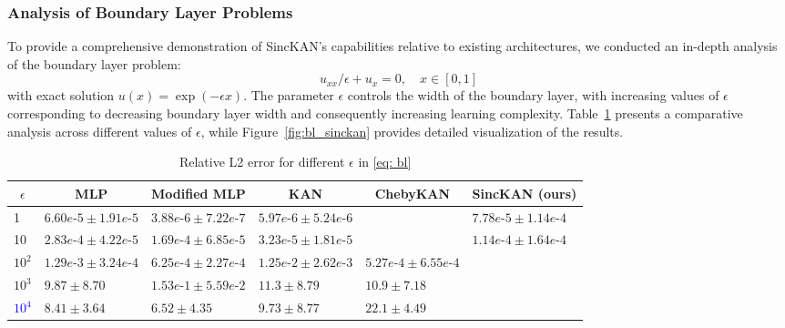 \subsubsection{Analysis of Boundary Layer Problems}
To provide a comprehensive demonstration of SincKAN's capabilities relative to existing architectures, we conducted an in-depth analysis of the boundary layer problem:
\begin{equation} \label
{eq: bl}
u_{xx}/\epsilon+u_{x}=0, \quad x \in
 [0,1]
\end{equation}
with exact solution $u(x)=\exp (-\epsilon x)$. The parameter $\epsilon$ controls the width of the boundary layer, with increasing values of $\epsilon$ corresponding to decreasing boundary layer width and consequently increasing learning complexity. Table~\ref{table:bl_pikan} presents a comparative analysis across different values of $\epsilon$, while Figure~\ref{fig:bl_sinckan}
 provides detailed visualization of the results.

\begin{table}[ht]
\caption{Relative L2 error for different $\epsilon$ in \cref{eq: bl}}
\label{table:bl_pikan}
\begin{center}
\begin{adjustbox}{width=\columnwidth, center}
\begin{tabular}{llllll}
\multicolumn{1}{c}{\bf $\epsilon$ } & \multicolumn{1}{c}{\bf MLP} & \multicolumn{1}{c}{\bf Modified MLP} &\multicolumn{1}{c}{\bf KAN} &\multicolumn{1}{c}{\bf ChebyKAN} & \multicolumn{1}{c}{\bf SincKAN (ours)} 
\\ \hline 
1    & $ 6.60e\mbox{-}5 \pm 1.91e\mbox{-}5 $ &$ 3.88e\mbox{-}6 \pm 7.22e\mbox{-}7 $   & $ 5.97e\mbox{-}6 \pm 5.24e\mbox{-}6 $ & \color{red}{$ 1.98e\mbox{-}6 \pm 4.51e\mbox{-}7 $} & $ 7.78e\mbox{-}5 \pm 1.14e\mbox{-}4 $ \\
10   & $ 2.83e\mbox{-}4 \pm 4.22e\mbox{-}5 $& $ 1.69e\mbox{-}4 \pm 6.85e\mbox{-}5 $ &$ 3.23e\mbox{-}5 \pm 1.81e\mbox{-}5 $ & \color{red}{$4.45e\mbox{-}6 \pm 4.01e\mbox{-}7$} & $1.14e\mbox{-}4 \pm 1.64e\mbox{-}4 $\\
$10^2$  & $ 1.29e\mbox{-}3 \pm 3.24e\mbox{-}4 $& $ 6.25e\mbox{-}4 \pm 2.27e\mbox{-}4 $ & $ 1.25e\mbox{-}2 \pm 2.62e\mbox{-}3 $ & $ 5.27e\mbox{-}4 \pm 6.55e\mbox{-}4 $& \color{red}{$1.68e\mbox{-}4 \pm 6.16e\mbox{-}5$} \\
$10^3$ &$ 9.87 \pm 8.70 $ & $ 1.53e\mbox{-}1 \pm 5.59e\mbox{-}2 $    & $ 11.3 \pm 8.79 $ & $ 10.9 \pm 7.18 $ & \color{red}{$5.48e\mbox{-}3 \pm 3.45e\mbox{-}3$}\\
\textcolor{blue}{$10^4$} &$ 8.41 \pm 3.64 $ & $ 6.52 \pm 4.35 $    & $ 9.73 \pm 8.77 $ & $ 22.1 \pm 4.49 $ & \color{red}{$5.27e\mbox{-}3 \pm 1.29e\mbox{-}3$}
\end{tabular}
\end{adjustbox}
\end{center}
\end{table}

